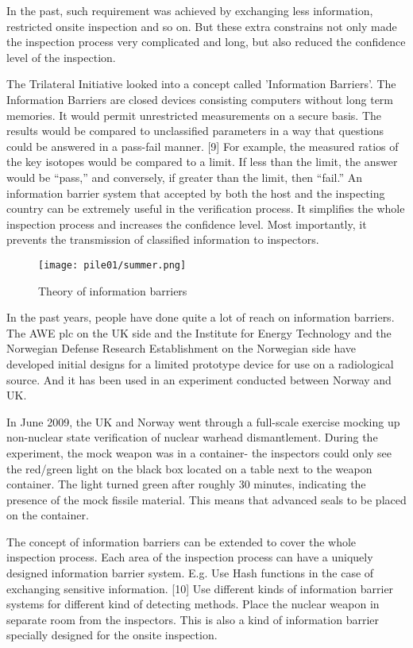 \documentclass[twoside,titlepage,11pt,twocolumn,a4paper]{article}
\begin{document}
In the past, such requirement was achieved by exchanging less
information, restricted onsite inspection and so on. But these extra
constrains not only made the inspection process very complicated and
long, but also reduced the confidence level of the inspection.

The Trilateral Initiative looked into a concept called 'Information
Barriers'. The Information Barriers are closed devices consisting
computers without long term memories. It would permit unrestricted
measurements on a secure basis. The results would be compared to
unclassified parameters in a way that questions could be answered in a
pass-fail manner. [9] For example, the measured ratios of the key
isotopes would be compared to a limit. If less than the limit, the
answer would be ``pass,'' and conversely, if greater than the limit,
then ``fail.'' An information barrier system that accepted by both the
host and the inspecting country can be extremely useful in the
verification process. It simplifies the whole inspection process and
increases the confidence level. Most importantly, it prevents the
transmission of classified information to inspectors.

\begin{figure}
  \texttt{[image: pile01/summer.png]}
  \caption{Theory of information barriers}
\end{figure}

In the past years, people have done quite a lot of reach on
information barriers. The AWE plc on the UK side and the Institute for
Energy Technology and the Norwegian Defense Research Establishment on
the Norwegian side have developed initial designs for a limited
prototype device for use on a radiological source. And it has been
used in an experiment conducted between Norway and UK.

In June 2009, the UK and Norway went through a full-scale exercise
mocking up non-nuclear state verification of nuclear warhead
dismantlement.  During the experiment, the mock weapon was in a
container- the inspectors could only see the red/green light on the
black box located on a table next to the weapon container. The light
turned green after roughly 30 minutes, indicating the presence of the
mock fissile material. This means that advanced seals to be placed on
the container.

The concept of information barriers can be extended to cover the whole
inspection process. Each area of the inspection process can have a
uniquely designed information barrier system. E.g. Use Hash functions
in the case of exchanging sensitive information. [10] Use different
kinds of information barrier systems for different kind of detecting
methods. Place the nuclear weapon in separate room from the
inspectors.  This is also a kind of information barrier specially
designed for the onsite inspection.
\end{document}
